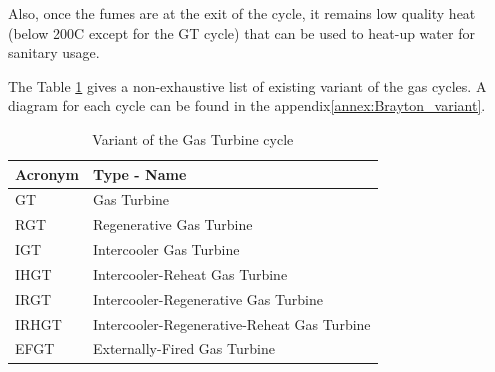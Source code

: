 Also, once the fumes are at the exit of the cycle, it remains low quality heat (below 200\degree C except for the GT cycle) that can be used to heat-up water for sanitary usage.

The Table \ref{tab:C5_inputconfig} gives a non-exhaustive list of existing variant of the gas cycles. A diagram for each cycle can be found in the appendix\ref{annex:Brayton_variant}.
\begin{longtable}[c]{ll}
\caption{Variant of the Gas Turbine cycle}
\label{tab:C5_inputconfig}\\
\toprule
\textbf{Acronym} & \textbf{Type - Name}                   \\* \midrule
\endfirsthead
%
\endhead
%
\bottomrule
\endfoot
%
\endlastfoot
%
GT                           & Gas Turbine                                 \\
RGT                          & Regenerative Gas Turbine                    \\
IGT                          & Intercooler Gas Turbine                     \\
IHGT                         & Intercooler-Reheat Gas Turbine              \\
IRGT                         & Intercooler-Regenerative Gas Turbine        \\
IRHGT                        & Intercooler-Regenerative-Reheat Gas Turbine \\
EFGT                         & Externally-Fired Gas Turbine                \\* \bottomrule
\end{longtable}

